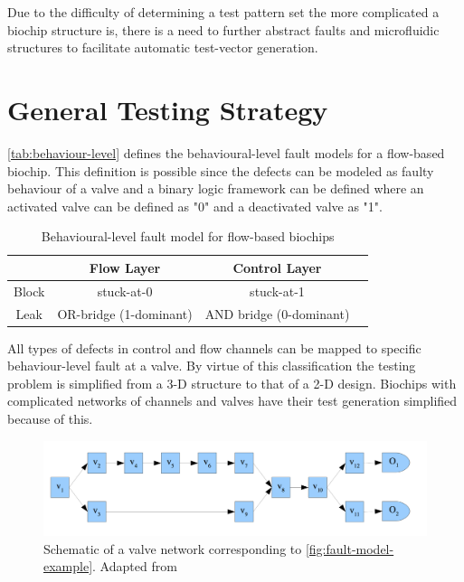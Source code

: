 Due to the difficulty of determining a test pattern set the more complicated a biochip structure is, there is a need to further abstract faults and microfluidic structures to facilitate automatic test-vector generation.

\section{General Testing Strategy}
\label{sec:general-testing-strategy}
\autoref{tab:behaviour-level} defines the behavioural-level fault models for a flow-based biochip. This definition is possible since the defects can be modeled as faulty behaviour of a valve and a binary logic framework can be defined where an activated valve can be defined as "0" and a deactivated valve as "1".

\begin{table}[H]
\centering
\caption{Behavioural-level fault model for flow-based biochips \cite{fault-modeling}}
\begin{tabular}{| c | c | c | c |}
\hline
${}$ & \textbf{Flow Layer} & \textbf{Control Layer} \\ \hline
Block & stuck-at-0 & stuck-at-1 \\ \hline
Leak & OR-bridge (1-dominant) & AND bridge (0-dominant) \\ \hline
\end{tabular}
\label{tab:behaviour-level}
\end{table}

All types of defects in control and flow channels can be mapped to specific behaviour-level fault at a valve. By virtue of this classification the testing problem is simplified from a 3-D structure to that of a 2-D design. Biochips with complicated networks of channels and valves have their test generation simplified because of this.


\begin{figure}[H]
\centering
\includegraphics[scale=0.35]{figures/valve-network.png}
\caption[Schematic of a valve network corresponding to \autoref{fig:fault-model-example}. Adapted from \cite{fault-modeling}]{Schematic of a valve network corresponding to \autoref{fig:fault-model-example}. Adapted from \cite{fault-modeling}}
\label{fig:valve-network}
\end{figure}

